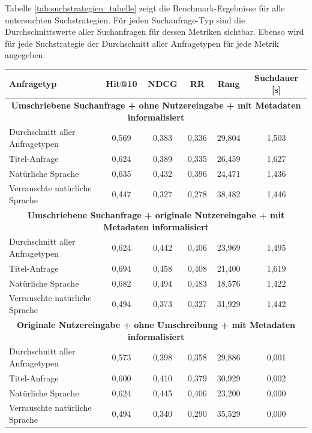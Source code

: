 \documentclass[12pt,letterpaper]{article} %
\begin{document}
Tabelle \ref{tab:suchstrategien_tabelle} zeigt die Benchmark-Ergebnisse für alle untersuchten Suchstrategien.
Für jeden Suchanfrage-Typ sind die Durchschnittswerte aller Suchanfragen für dessen Metriken sichtbar.
Ebenso wird für jede Suchstrategie der Durchschnitt aller Anfragetypen für jede Metrik angegeben.

\begin{table}[H]
\centering
\begin{tabular}{lccccc}
\toprule
\textbf{Anfragetyp} & \textbf{Hit@10} & \textbf{NDCG} & \textbf{RR} & \textbf{Rang} & \textbf{Suchdauer [s]} \\
\midrule
\multicolumn{6}{c}{\textbf{Umschriebene Suchanfrage + ohne Nutzereingabe + mit Metadaten informalisiert}} \\
\midrule

Durchschnitt aller Anfragetypen & 0,569 & 0,383 & 0,336 & 29,804 & 1,503 \\
Titel-Anfrage & 0,624 & 0,389 & 0,335 & 26,459 & 1,627 \\
Natürliche Sprache & 0,635 & 0,432 & 0,396 & 24,471 & 1,436 \\
Verrauschte natürliche Sprache & 0,447 & 0,327 & 0,278 & 38,482 & 1,446 \\

\midrule
\multicolumn{6}{c}{\textbf{Umschriebene Suchanfrage + originale Nutzereingabe + mit Metadaten informalisiert}} \\
\midrule

Durchschnitt aller Anfragetypen & 0,624 & 0,442 & 0,406 & 23,969 & 1,495 \\
Titel-Anfrage & 0,694 & 0,458 & 0,408 & 21,400 & 1,619 \\
Natürliche Sprache & 0,682 & 0,494 & 0,483 & 18,576 & 1,422 \\
Verrauschte natürliche Sprache & 0,494 & 0,373 & 0,327 & 31,929 & 1,442 \\

\midrule
\multicolumn{6}{c}{\textbf{Originale Nutzereingabe + ohne Umschreibung + mit Metadaten informalisiert}} \\
\midrule

Durchschnitt aller Anfragetypen & 0,573 & 0,398 & 0,358 & 29,886 & 0,001 \\
Titel-Anfrage & 0,600 & 0,410 & 0,379 & 30,929 & 0,002 \\
Natürliche Sprache & 0,624 & 0,445 & 0,406 & 23,200 & 0,000 \\
Verrauschte natürliche Sprache & 0,494 & 0,340 & 0,290 & 35,529 & 0,000 \\


\end{tabular}
\end{table}
\end{document}
